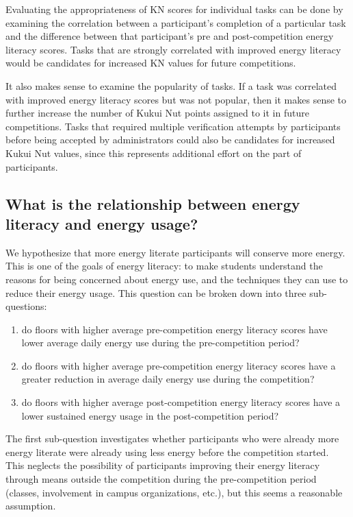 Evaluating the appropriateness of KN scores for individual tasks can be done by examining the correlation between a participant's completion of a particular task and the difference between that participant's pre and post-competition energy literacy scores. Tasks that are strongly correlated with improved energy literacy would be candidates for increased KN values for future competitions.

It also makes sense to examine the popularity of tasks. If a task was correlated with improved energy literacy scores but was not popular, then it makes sense to further increase the number of Kukui Nut points assigned to it in future competitions. Tasks that required multiple verification attempts by participants before being accepted by administrators could also be candidates for increased Kukui Nut values, since this represents additional effort on the part of participants.

\subsection{What is the relationship between energy literacy and energy usage?}

We hypothesize that more energy literate participants will conserve more energy. This is one of the goals of energy literacy: to make students understand the reasons for being concerned about energy use, and the techniques they can use to reduce their energy usage. This question can be broken down into three sub-questions:

\begin{enumerate}
	\item do floors with higher average pre-competition energy literacy scores have lower average daily energy use during the pre-competition period?
	\item do floors with higher average pre-competition energy literacy scores have a greater reduction in average daily energy use during the competition?
	\item do floors with higher average post-competition energy literacy scores have a lower sustained energy usage in the post-competition period?
\end{enumerate}

The first sub-question investigates whether participants who were already more energy literate were already using less energy before the competition started. This neglects the possibility of participants improving their energy literacy through means outside the competition during the pre-competition period (classes, involvement in campus organizations, etc.), but this seems a reasonable assumption.

